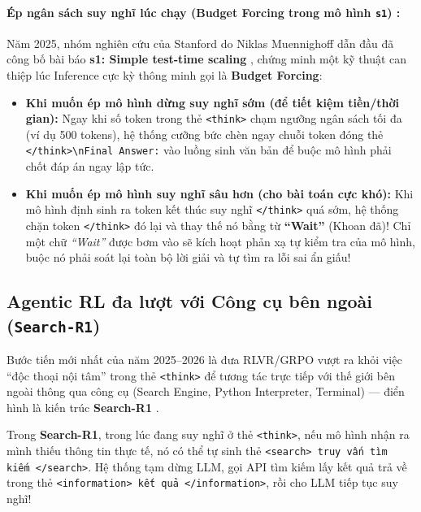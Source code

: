 \paragraph{Ép ngân sách suy nghĩ lúc chạy (Budget Forcing trong mô hình \texttt{s1}) \citep{muennighoff2025s1}:}
Năm 2025, nhóm nghiên cứu của Stanford do Niklas Muennighoff dẫn đầu đã công bố bài báo \textbf{s1: Simple test-time scaling} \citep{muennighoff2025s1}, chứng minh một kỹ thuật can thiệp lúc Inference cực kỳ thông minh gọi là \textbf{Budget Forcing}:
\begin{itemize}
  \item \textbf{Khi muốn ép mô hình dừng suy nghĩ sớm (để tiết kiệm tiền/thời gian):} Ngay khi số token trong thẻ \texttt{<think>} chạm ngưỡng ngân sách tối đa (ví dụ 500 tokens), hệ thống cưỡng bức chèn ngay chuỗi token đóng thẻ \texttt{</think>\textbackslash nFinal Answer:} vào luồng sinh văn bản để buộc mô hình phải chốt đáp án ngay lập tức.
  \item \textbf{Khi muốn ép mô hình suy nghĩ sâu hơn (cho bài toán cực khó):} Khi mô hình định sinh ra token kết thúc suy nghĩ \texttt{</think>} quá sớm, hệ thống chặn token \texttt{</think>} đó lại và thay thế nó bằng từ \textbf{``Wait''} (Khoan đã)! Chỉ một chữ \textit{``Wait''} được bơm vào sẽ kích hoạt phản xạ tự kiểm tra của mô hình, buộc nó phải soát lại toàn bộ lời giải và tự tìm ra lỗi sai ẩn giấu!
\end{itemize}

\subsection{Agentic RL đa lượt với Công cụ bên ngoài (\texttt{Search-R1})}

Bước tiến mới nhất của năm 2025--2026 là đưa RLVR/GRPO vượt ra khỏi việc ``độc thoại nội tâm'' trong thẻ \texttt{<think>} để tương tác trực tiếp với thế giới bên ngoài thông qua công cụ (Search Engine, Python Interpreter, Terminal) --- điển hình là kiến trúc \textbf{Search-R1} \citep{jin2025searchr1}.

Trong \textbf{Search-R1}, trong lúc đang suy nghĩ ở thẻ \texttt{<think>}, nếu mô hình nhận ra mình thiếu thông tin thực tế, nó có thể tự sinh thẻ \texttt{<search> truy vấn tìm kiếm </search>}. Hệ thống tạm dừng LLM, gọi API tìm kiếm lấy kết quả trả về trong thẻ \texttt{<information> kết quả </information>}, rồi cho LLM tiếp tục suy nghĩ!


